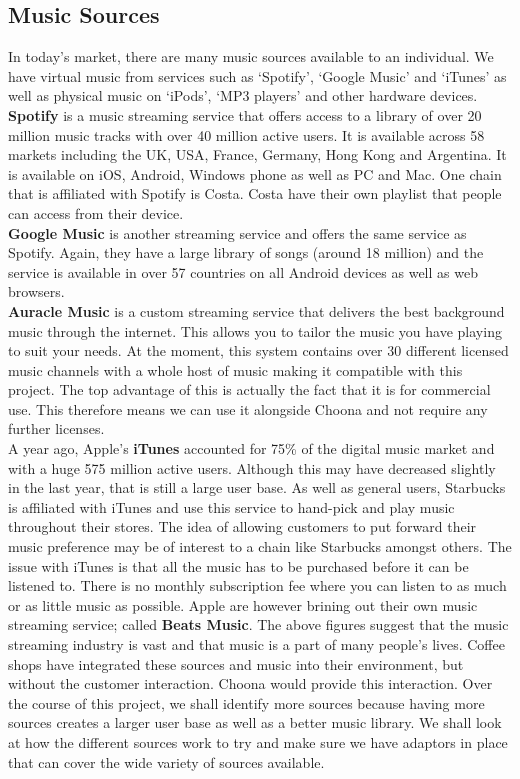 \subsection{Music Sources}
In today's market, there are many music sources available to an individual. We have virtual music from services such as `Spotify', `Google Music' and `iTunes' as well as physical music on `iPods', `MP3 players' and other hardware devices. \\

\textbf{Spotify} is a music streaming service that offers access to a library of over 20 million music tracks with over 40 million active users. It is available across 58 markets including the UK, USA, France, Germany, Hong Kong and Argentina. It is available on iOS, Android, Windows phone as well as PC and Mac. One chain that is affiliated with Spotify is Costa. Costa have their own playlist that people can access from their device. \\
\textbf{Google Music} is another streaming service and offers the same service as Spotify. Again, they have a large library of songs (around 18 million) and the service is available in over 57 countries on all Android devices as well as web browsers. \\
\textbf{Auracle Music} is a custom streaming service that delivers the best background music through the internet.  This allows you to tailor the music you have playing to suit your needs.  At the moment, this system contains over 30 different licensed music channels with a whole host of music making it compatible with this project.  The top advantage of this is actually the fact that it is for commercial use.  This therefore means we can use it alongside Choona and not require any further licenses.  \\
A year ago, Apple's \textbf{iTunes} accounted for 75\% of the digital music market and with a huge 575 million active users. Although this may have decreased slightly in the last year, that is still a large user base. As well as general users, Starbucks is affiliated with iTunes and use this service to hand-pick and play music throughout their stores. The idea of allowing customers to put forward their music preference may be of interest to a chain like Starbucks amongst others. 
The issue with iTunes is that all the music has to be purchased before it can be listened to.  There is no monthly subscription fee where you can listen to as much or as little music as possible.  Apple are however brining out their own music streaming service; called \textbf{Beats Music}.    
The above figures suggest that the music streaming industry is vast and that music is a part of many people's lives. Coffee shops have integrated these sources and music into their environment, but without the customer interaction. Choona would provide this interaction. Over the course of this project, we shall identify more sources because having more sources creates a larger user base as well as a better music library. We shall look at how the different sources work to try and make sure we have adaptors in place that can cover the wide variety of sources available. 

